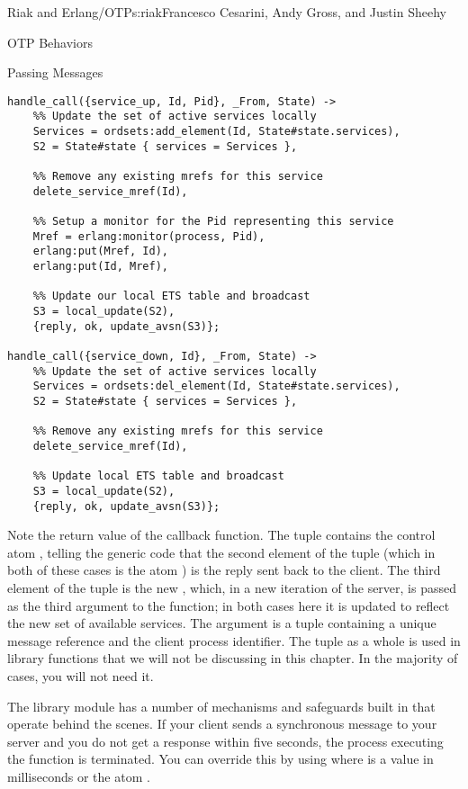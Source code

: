 \begin{aosachapter}{Riak and Erlang/OTP}{s:riak}{Francesco Cesarini, Andy Gross, and Justin Sheehy}
\begin{aosasect1}{OTP Behaviors}
\begin{aosasect2}{Passing Messages}
\begin{verbatim}
handle_call({service_up, Id, Pid}, _From, State) ->
    %% Update the set of active services locally
    Services = ordsets:add_element(Id, State#state.services),
    S2 = State#state { services = Services },

    %% Remove any existing mrefs for this service
    delete_service_mref(Id),

    %% Setup a monitor for the Pid representing this service
    Mref = erlang:monitor(process, Pid),
    erlang:put(Mref, Id),
    erlang:put(Id, Mref),

    %% Update our local ETS table and broadcast
    S3 = local_update(S2),
    {reply, ok, update_avsn(S3)};

handle_call({service_down, Id}, _From, State) ->
    %% Update the set of active services locally
    Services = ordsets:del_element(Id, State#state.services),
    S2 = State#state { services = Services },

    %% Remove any existing mrefs for this service
    delete_service_mref(Id),

    %% Update local ETS table and broadcast
    S3 = local_update(S2),
    {reply, ok, update_avsn(S3)};
\end{verbatim}

\noindent Note the return value of the callback function. The tuple contains the
control atom , telling the  generic code
that the second element of the tuple (which in both of these cases is
the atom ) is the reply sent back to the client. The third
element of the tuple is the new , which, in a new
iteration of the server, is passed as the third argument to the
 function; in both cases here it is updated to
reflect the new set of available services. The argument 
is a tuple containing a unique message reference and the client
process identifier. The tuple as a whole is used in library functions
that we will not be discussing in this chapter. In the majority of
cases, you will not need it.

The  library module has a number of mechanisms and
safeguards built in that operate behind the scenes. If your client
sends a synchronous message to your server and you do not get a
response within five seconds, the process executing the 
function is terminated. You can override this by using
 where 
is a value in milliseconds or the atom .


\end{aosasect2}
\end{aosasect1}
\end{aosachapter}

